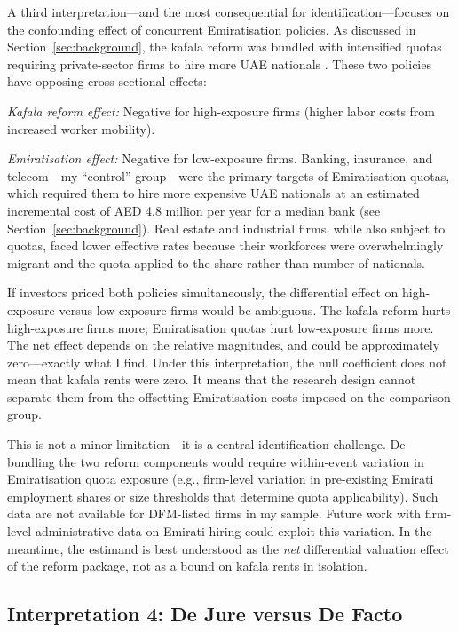 \documentclass[12pt]{article}
\begin{document}
A third interpretation---and the most consequential for identification---focuses on the confounding effect of concurrent Emiratisation policies. As discussed in Section~\ref{sec:background}, the kafala reform was bundled with intensified quotas requiring private-sector firms to hire more UAE nationals \citep{nafis2022resolution}. These two policies have opposing cross-sectional effects:

\textit{Kafala reform effect:} Negative for high-exposure firms (higher labor costs from increased worker mobility).

\textit{Emiratisation effect:} Negative for low-exposure firms. Banking, insurance, and telecom---my ``control'' group---were the primary targets of Emiratisation quotas, which required them to hire more expensive UAE nationals at an estimated incremental cost of AED 4.8 million per year for a median bank (see Section~\ref{sec:background}). Real estate and industrial firms, while also subject to quotas, faced lower effective rates because their workforces were overwhelmingly migrant and the quota applied to the share rather than number of nationals.

If investors priced both policies simultaneously, the differential effect on high-exposure versus low-exposure firms would be ambiguous. The kafala reform hurts high-exposure firms more; Emiratisation quotas hurt low-exposure firms more. The net effect depends on the relative magnitudes, and could be approximately zero---exactly what I find. Under this interpretation, the null coefficient does not mean that kafala rents were zero. It means that the research design cannot separate them from the offsetting Emiratisation costs imposed on the comparison group.

This is not a minor limitation---it is a central identification challenge. De-bundling the two reform components would require within-event variation in Emiratisation quota exposure (e.g., firm-level variation in pre-existing Emirati employment shares or size thresholds that determine quota applicability). Such data are not available for DFM-listed firms in my sample. Future work with firm-level administrative data on Emirati hiring could exploit this variation. In the meantime, the estimand is best understood as the \emph{net} differential valuation effect of the reform package, not as a bound on kafala rents in isolation.

\subsection{Interpretation 4: De Jure versus De Facto}
\end{document}
